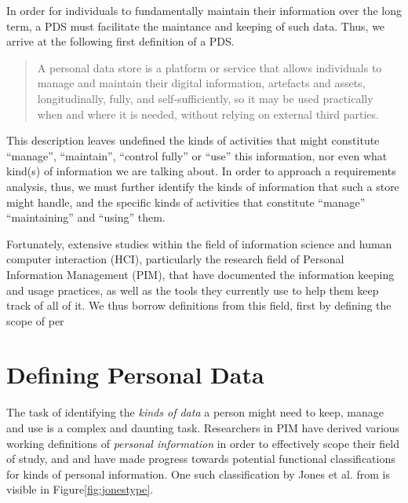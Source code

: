\documentclass[runningheads,a4paper]{llncs}
\begin{document}
In order for individuals to fundamentally maintain their information over the long term, a PDS must facilitate the maintance and keeping of such data. Thus, we arrive at the following first definition of a PDS.

\begin{quote}

	A personal data store is a platform or service that allows individuals to manage and maintain their digital information, artefacts and assets, longitudinally, fully, and self-sufficiently, so it may be used practically when and where it is needed, without relying on external third parties. 

\end{quote}

This description leaves undefined the kinds of activities that might constitute ``manage'', ``maintain'', ``control fully'' or ``use'' this information, nor even what kind(s) of information we are talking about.  In order to approach a requirements analysis, thus, we must further identify the kinds of information that such a store might handle, and the specific kinds of activities that constitute ``manage'' ``maintaining'' and ``using'' them. 

Fortunately, extensive studies within the field of information science and human computer interaction (HCI), particularly the research field of Personal Information Management (PIM), that have documented the information keeping and usage practices, as well as the tools they currently use to help them keep track of all of it.  We thus borrow definitions from this field, first by defining the scope of per

\section{Defining Personal Data}

The task of identifying the \emph{kinds of data} a person might need to keep, manage and use is a complex and daunting task.  Researchers in PIM have derived various working definitions of \emph{personal information} in order to effectively scope their field of study, and and have made progress towards potential functional classifications for kinds of personal information. One such classification by Jones et al. from \cite{kftf} is visible in Figure\ref{fig:jonestype}.
\end{document}
